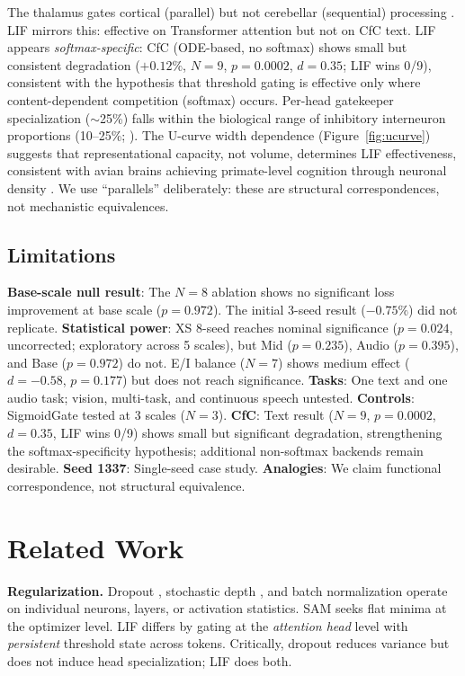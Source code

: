 \documentclass[11pt]{article}
\begin{document}
The thalamus gates cortical (parallel) but not cerebellar (sequential) processing \cite{schmahmann1997cerebrocerebellar}. LIF mirrors this: effective on Transformer attention but not on CfC text. LIF appears \emph{softmax-specific}: CfC (ODE-based, no softmax) shows small but consistent degradation ($+0.12\%$, $N{=}9$, $p = 0.0002$, $d = 0.35$; LIF wins 0/9), consistent with the hypothesis that threshold gating is effective only where content-dependent competition (softmax) occurs. Per-head gatekeeper specialization ($\sim$25\%) falls within the biological range of inhibitory interneuron proportions (10--25\%; \cite{alizadeh2024ei}). The U-curve width dependence (Figure~\ref{fig:ucurve}) suggests that representational capacity, not volume, determines LIF effectiveness, consistent with avian brains achieving primate-level cognition through neuronal density \cite{olkowicz2016birds}. We use ``parallels'' deliberately: these are structural correspondences, not mechanistic equivalences.

\subsection{Limitations}

\textbf{Base-scale null result}: The $N{=}8$ ablation shows no significant loss improvement at base scale ($p = 0.972$). The initial 3-seed result ($-0.75\%$) did not replicate. \textbf{Statistical power}: XS 8-seed reaches nominal significance ($p = 0.024$, uncorrected; exploratory across 5 scales), but Mid ($p = 0.235$), Audio ($p = 0.395$), and Base ($p = 0.972$) do not. E/I balance ($N{=}7$) shows medium effect ($d = -0.58$, $p = 0.177$) but does not reach significance. \textbf{Tasks}: One text and one audio task; vision, multi-task, and continuous speech untested. \textbf{Controls}: SigmoidGate tested at 3 scales ($N{=}3$). \textbf{CfC}: Text result ($N{=}9$, $p = 0.0002$, $d = 0.35$, LIF wins 0/9) shows small but significant degradation, strengthening the softmax-specificity hypothesis; additional non-softmax backends remain desirable. \textbf{Seed 1337}: Single-seed case study. \textbf{Analogies}: We claim functional correspondence, not structural equivalence.


\section{Related Work}

\textbf{Regularization.}
Dropout \cite{srivastava2014dropout}, stochastic depth \cite{huang2016stochastic}, and batch normalization \cite{ioffe2015batch} operate on individual neurons, layers, or activation statistics. SAM \cite{foret2021sharpnessaware} seeks flat minima at the optimizer level. LIF differs by gating at the \emph{attention head} level with \emph{persistent} threshold state across tokens. Critically, dropout reduces variance but does not induce head specialization; LIF does both.
\end{document}

